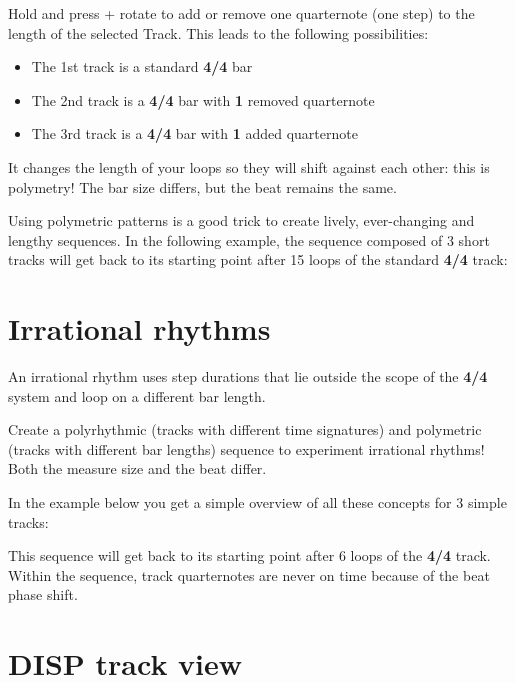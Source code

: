 Hold  and press + rotate \encodericon{} to add or remove one quarternote (one step) to the length of the selected Track. This leads to the following possibilities:


\begin{itemize}
\item The 1st track is a standard \textbf{4/4} bar
\item The 2nd track is a \textbf{4/4} bar with \textbf{1} removed quarternote
\item The 3rd track is a \textbf{4/4} bar with \textbf{1} added quarternote
\end{itemize}

It changes the length of your loops so they will shift against each other: this is polymetry! The bar size differs, but the beat remains the same.

Using polymetric patterns is a good trick to create lively, ever-changing and lengthy sequences. In the following example, the sequence composed of 3 short tracks will get back to its starting point after 15 loops of the standard \textbf{4/4} track:




\section{Irrational rhythms}

An irrational rhythm uses step durations that lie outside the scope of the \textbf{4/4} system and loop on a different bar length.

Create a polyrhythmic (tracks with different time signatures) and polymetric (tracks with different bar lengths) sequence to experiment irrational rhythms! Both the measure size and the beat differ.

In the example below you get a simple overview of all these concepts for 3 simple tracks:


This sequence will get back to its starting point after 6 loops of the \textbf{4/4} track. Within the sequence, track quarternotes are never on time because of the beat phase shift.


\section{DISP track view}

